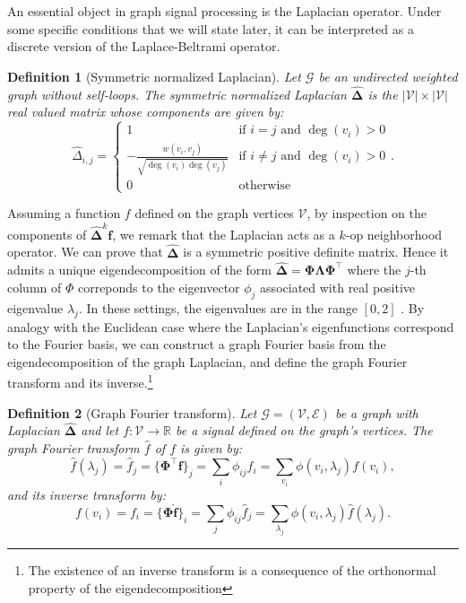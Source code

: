 \documentclass{article}
\newtheorem{definition}{Definition}[section]
\begin{document}
An essential object in graph signal processing is the Laplacian operator. Under some specific conditions that we will state later, it can be interpreted as a discrete version of the Laplace-Beltrami operator.
\begin{definition}[Symmetric normalized Laplacian] \label{def:graph_laplacian}
Let $\mathcal{G}$ be an undirected weighted graph without self-loops. The symmetric normalized Laplacian $\boldsymbol{\hat{\Delta}}$ is the $|\mathcal{V}| \times |\mathcal{V}|$ real valued matrix whose components are given by:
\begin{equation}
\hat{\Delta}_{i, j} =
\left\{
\begin{array}{ll}
1 & \text{if } i = j \text{ and } \deg(v_i) > 0 \\
- \frac{w(v_i, v_j)}{\sqrt{\deg (v_i) \deg (v_j)}} & \text{if } i \neq j \text{ and } \deg(v_i) > 0 \\ 
0 & \text{otherwise}
\end{array}
\right..
\end{equation}
\end{definition}

Assuming a function $f$ defined on the graph vertices $\mathcal{V}$, by inspection on the components of $\boldsymbol{\hat{\Delta}}^k \boldsymbol{f}$, we remark that the Laplacian acts as a $k$-op neighborhood operator. We can prove that $\boldsymbol{\hat{\Delta}}$ is a symmetric positive definite matrix. Hence it admits a unique eigendecomposition of the form $\boldsymbol{\hat{\Delta}} = \boldsymbol{\Phi \Lambda \Phi}^\top$ where the $j$-th column of $\Phi$ correponds to the eigenvector $\phi_j$ associated with real positive eigenvalue $\lambda_j$. In these settings, the eigenvalues are in the range $[0, 2]$ \citep{chung1997spectral}. By analogy with the Euclidean case where the Laplacian's eigenfunctions correspond to the Fourier basis, we can construct a graph Fourier basis from the eigendecomposition of the graph Laplacian, and define the graph Fourier transform and its inverse.\footnote{The existence of an inverse transform is a consequence of the orthonormal property of the eigendecomposition}
\begin{definition}[Graph Fourier transform]
Let $\mathcal{G} = (\mathcal{V}, \mathcal{E})$ be a graph with Laplacian $\boldsymbol{\hat{\Delta}}$ and let $f : \mathcal{V} \to \mathbb{R}$ be a signal defined on the graph's vertices. The graph Fourier transform $\hat{f}$ of $f$ is given by:
\begin{equation}
\hat{f}(\lambda_j) = \hat{f}_j = \{ \boldsymbol{\Phi}^\top \boldsymbol{f}\}_j = \sum_i \phi_{ij} f_i = \sum_{v_i} \phi(v_i, \lambda_j) f(v_i),
\end{equation}
and its inverse transform by:
\begin{equation}
f(v_i) = f_i = \{\boldsymbol{\Phi}  \boldsymbol{\hat{f}} \}_i = \sum_j \phi_{ij} \hat{f}_j = \sum_{\lambda_j} \phi(v_i, \lambda_j) \hat{f}(\lambda_j).
\end{equation}
\end{definition}
\end{document}
